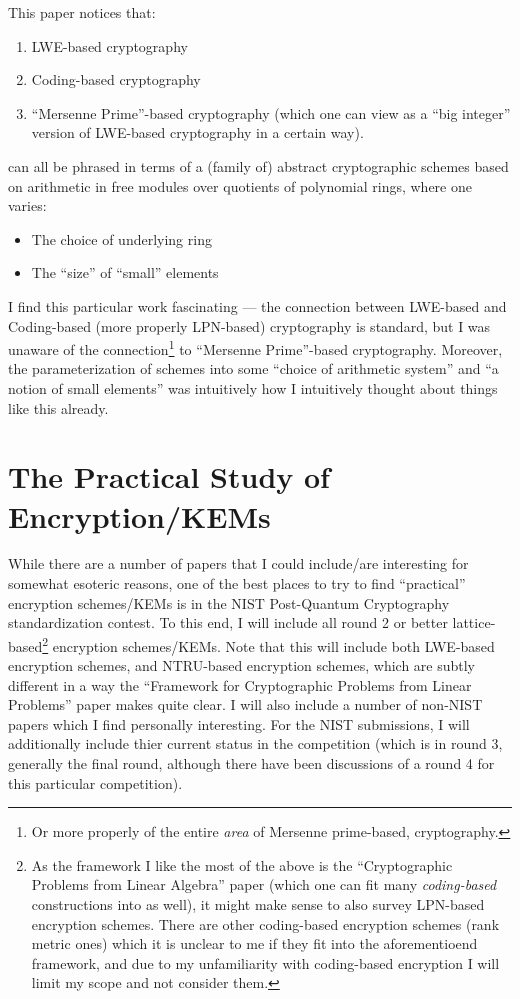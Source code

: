 \documentclass{article}
\begin{document}
	This paper notices that:
	\begin{enumerate}
		\item LWE-based cryptography
		\item Coding-based cryptography
		\item ``Mersenne Prime''-based cryptography (which one can view as a ``big integer'' version of LWE-based cryptography in a certain way).
	\end{enumerate}
	can all be phrased in terms of a (family of) abstract cryptographic schemes based on arithmetic in free modules over quotients of polynomial rings, where one varies:
	\begin{itemize}
		\item The choice of underlying ring
		\item The ``size'' of ``small'' elements
	\end{itemize}
	I find this particular work fascinating --- the connection between LWE-based and Coding-based (more properly LPN-based) cryptography is standard, but I was unaware of the connection\footnote{Or more properly of the entire \emph{area} of Mersenne prime-based, cryptography.} to ``Mersenne Prime''-based cryptography.
	Moreover, the parameterization of schemes into some ``choice of arithmetic system'' and ``a notion of small elements'' was intuitively how I intuitively thought about things like this already.
	
	\section{The Practical Study of Encryption/KEMs}
	While there are a number of papers that I could include/are interesting for somewhat esoteric reasons, one of the best places to try to find ``practical'' encryption schemes/KEMs is in the NIST Post-Quantum Cryptography standardization contest.
	To this end, I will include all round 2 or better lattice-based\footnote{As the framework I like the most of the above is the ``Cryptographic Problems from Linear Algebra'' paper (which one can fit many \emph{coding-based} constructions into as well), it might make sense to also survey LPN-based encryption schemes.
	There are other coding-based encryption schemes (rank metric ones) which it is unclear to me if they fit into the aforementioend framework, and due to my unfamiliarity with coding-based encryption I will limit my scope and not consider them.} encryption schemes/KEMs.
	Note that this will include both LWE-based encryption schemes, and NTRU-based encryption schemes, which are subtly different in a way the ``Framework for Cryptographic Problems from Linear Problems'' paper makes quite clear.
	I will also include a number of non-NIST papers which I find personally interesting.
	For the NIST submissions, I will additionally include thier current status in the competition (which is in round 3, generally the final round, although there have been discussions of a round 4 for this particular competition).
	
\end{document}
